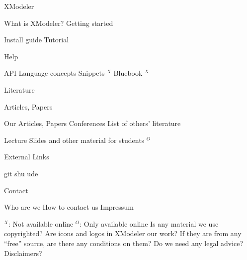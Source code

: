 
\begin{itemize}
\lowItem XModeler
\begin{itemize}
  \lowItem What is XModeler?
	\lowItem Getting started
	\begin{itemize}
		\lowItem Install guide
		\lowItem Tutorial
	\end{itemize}
	\lowItem Help
	\begin{itemize}
		\lowItem API
		\lowItem Language concepts
		\lowItem Snippets $^X$
		\lowItem Bluebook $^X$
	\end{itemize}
\end{itemize}
\lowItem Literature
\begin{itemize}
	\lowItem Articles, Papers
		\begin{itemize}
		\lowItem Our Articles, Papers
		\lowItem Conferences
		\lowItem List of others' literature
	\end{itemize}
	\lowItem Lecture Slides and other material for students $^O$
\end{itemize}
\lowItem External Links
\begin{itemize}
	\lowItem git
	\lowItem shu
	\lowItem ude
\end{itemize}
\lowItem Contact
\begin{itemize}
	\lowItem Who are we
	\lowItem How to contact us
	\lowItem Impressum
\end{itemize}
\end{itemize}
 $^X$: Not available online\newline
 $^O$: Only available online\newline
\newline
Is any material we use copyrighted? Are icons and logos in XModeler our work? If they are from any "`free"' source, are there any conditions on them?\newline
Do we need any legal advice? Disclaimers?
\\